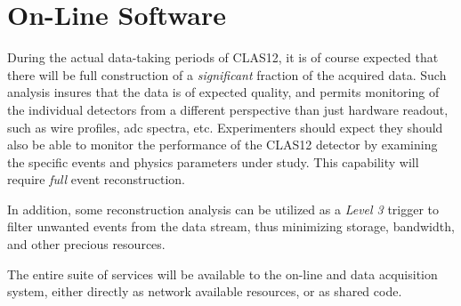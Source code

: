 \section{On-Line Software}

During the actual data-taking periods of CLAS12, it is of course expected that there will be full construction of a {\it significant} fraction of the acquired data. Such analysis insures that the data is of expected quality, and permits monitoring of the individual detectors from a different perspective than just hardware readout, such as wire profiles, adc spectra, etc. Experimenters should expect they should also be able to monitor the performance of the CLAS12 detector by examining the specific events and physics parameters under study. This capability will require {\it full} event reconstruction. 

In addition, some reconstruction analysis can be utilized as a {\it Level 3} trigger to filter unwanted events from the data stream, thus minimizing storage, bandwidth, and other precious resources.

The entire suite of services will be available to the on-line and data acquisition system, either directly as network available resources, or as shared code. 